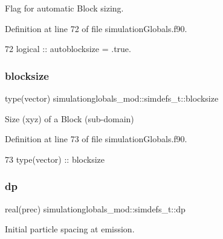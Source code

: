 Flag for automatic Block sizing. 



Definition at line 72 of file simulation\+Globals.\+f90.


\begin{DoxyCode}
72         \textcolor{keywordtype}{logical}         ::  autoblocksize = .true.   
\end{DoxyCode}
\mbox{\label{structsimulationglobals__mod_1_1simdefs__t_a163dc34a434aec7372dcad90b48ab0ed}} 
\subsubsection{\texorpdfstring{blocksize}{blocksize}}
{\footnotesize\ttfamily type(vector) simulationglobals\+\_\+mod\+::simdefs\+\_\+t\+::blocksize\hspace{0.3cm}{\ttfamily [private]}}



Size (xyz) of a Block (sub-\/domain) 



Definition at line 73 of file simulation\+Globals.\+f90.


\begin{DoxyCode}
73         \textcolor{keywordtype}{type}(vector)    ::  blocksize
\end{DoxyCode}
\mbox{\label{structsimulationglobals__mod_1_1simdefs__t_a27deca8939ad1f57e66c138800690505}} 
\subsubsection{\texorpdfstring{dp}{dp}}
{\footnotesize\ttfamily real(prec) simulationglobals\+\_\+mod\+::simdefs\+\_\+t\+::dp\hspace{0.3cm}{\ttfamily [private]}}



Initial particle spacing at emission. 



